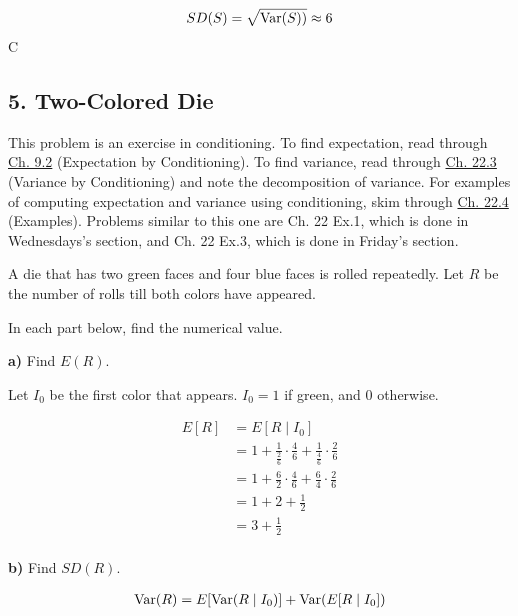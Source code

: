 \documentclass[11pt]{article}
\begin{document}
\[
SD(S) = \sqrt{\operatorname{Var}(S))} \approx 6
\]
 C  \newpage

    \hypertarget{two-colored-die}{%
\subsection{5. Two-Colored Die}\label{two-colored-die}}

This problem is an exercise in conditioning. To find expectation, read
through
\href{https://data140.org/textbook/content/chapter-09/expectation-by-conditioning/}{Ch.
9.2} (Expectation by Conditioning). To find variance, read through
\href{https://data140.org/textbook/content/chapter-22/variance-by-conditioning/}{Ch.
22.3} (Variance by Conditioning) and note the decomposition of variance.
For examples of computing expectation and variance using conditioning,
skim through
\href{https://data140.org/textbook/content/chapter-22/examples/}{Ch.
22.4} (Examples). Problems similar to this one are Ch. 22 Ex.1, which is
done in Wednesdays's section, and Ch. 22 Ex.3, which is done in Friday's
section.

A die that has two green faces and four blue faces is rolled repeatedly.
Let \(R\) be the number of rolls till both colors have appeared.

In each part below, find the numerical value.

\textbf{a)} Find \(E(R)\).

Let $I_0$ be the first color that appears. $I_{0} = 1$ if green, and $0$ otherwise.  

\begin{align*}
	E[R] &= E[R \mid I_0] \\
	&= 1 + \frac{1}{\frac{2}{6}} \cdot \frac{4}{6} + \frac{1}{\frac{4}{6}}\cdot  \frac{2}{6} \\
	&= 1 +  \frac{6}{2} \cdot \frac{4}{6} + \frac{6}{4} \cdot \frac{2}{6}\\
	&= 1 + 2 + \frac{1}{2} \\
	&= 3 + \frac{1}{2} \\
\end{align*}






\textbf{b)} Find \(SD(R)\).



\begin{align*}
	\operatorname{Var}(R) &= E[\operatorname{Var}(R \mid I_0)] + \operatorname{Var}(E[R \mid I_{0}])\\ 
\end{align*}
\end{document}

